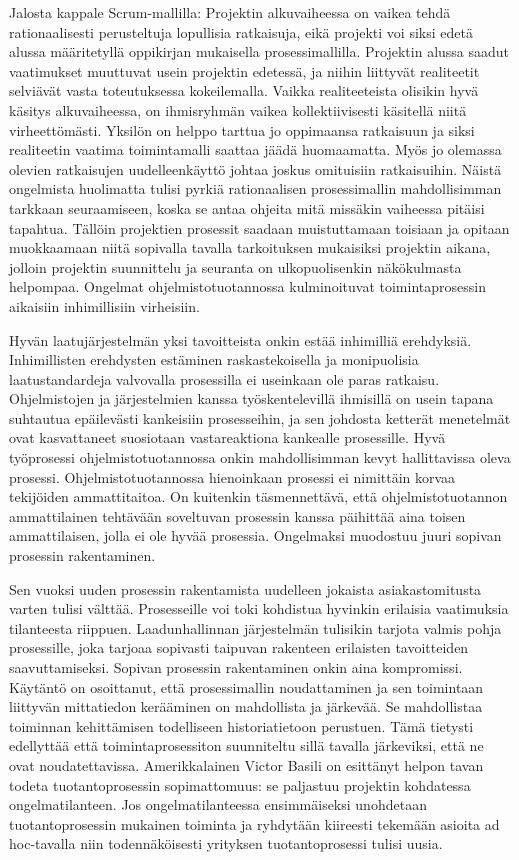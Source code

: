 \documentclass[finnish,12pt,a4paper,pdftex]{article}
\begin{document}
Jalosta kappale Scrum-mallilla:
Projektin alkuvaiheessa on vaikea tehdä rationaalisesti perusteltuja lopullisia ratkaisuja, eikä projekti voi siksi edetä alussa määritetyllä oppikirjan mukaisella prosessimallilla. Projektin alussa saadut vaatimukset muuttuvat usein projektin edetessä, ja niihin liittyvät realiteetit selviävät vasta toteutuksessa kokeilemalla. Vaikka realiteeteista olisikin hyvä käsitys alkuvaiheessa, on ihmisryhmän vaikea kollektiivisesti käsitellä niitä virheettömästi. Yksilön on helppo tarttua jo oppimaansa ratkaisuun ja siksi realiteetin vaatima toimintamalli saattaa jäädä huomaamatta. Myös jo olemassa olevien ratkaisujen uudelleenkäyttö johtaa joskus omituisiin ratkaisuihin. Näistä ongelmista huolimatta tulisi pyrkiä rationaalisen prosessimallin mahdollisimman tarkkaan seuraamiseen, koska se antaa ohjeita mitä missäkin vaiheessa pitäisi tapahtua. Tällöin projektien prosessit saadaan muistuttamaan toisiaan ja opitaan muokkaamaan niitä sopivalla tavalla tarkoituksen mukaisiksi projektin aikana, jolloin projektin suunnittelu ja seuranta on ulkopuolisenkin näkökulmasta helpompaa. Ongelmat ohjelmistotuotannossa kulminoituvat toimintaprosessin aikaisiin inhimillisiin virheisiin.\citep{ohjelmistotuotanto}

Hyvän laatujärjestelmän yksi tavoitteista onkin estää inhimilliä erehdyksiä. Inhimillisten erehdysten estäminen raskastekoisella ja monipuolisia laatustandardeja valvovalla prosessilla ei useinkaan ole paras ratkaisu. Ohjelmistojen ja järjestelmien kanssa työskentelevillä ihmisillä on usein tapana suhtautua epäilevästi kankeisiin prosesseihin, ja sen johdosta ketterät menetelmät ovat kasvattaneet suosiotaan vastareaktiona kankealle prosessille. Hyvä työprosessi ohjelmistotuotannossa onkin mahdollisimman kevyt hallittavissa oleva prosessi. Ohjelmistotuotannossa hienoinkaan prosessi ei nimittäin korvaa tekijöiden ammattitaitoa. On kuitenkin täsmennettävä, että ohjelmistotuotannon ammattilainen tehtävään soveltuvan prosessin kanssa päihittää aina toisen ammattilaisen, jolla ei ole hyvää prosessia. Ongelmaksi muodostuu juuri sopivan prosessin rakentaminen. \citep{okaytannot}

Sen vuoksi uuden prosessin rakentamista uudelleen jokaista asiakastomitusta varten tulisi välttää. Prosesseille voi toki kohdistua hyvinkin erilaisia vaatimuksia tilanteesta riippuen. Laadunhallinnan järjestelmän tulisikin tarjota valmis pohja prosessille, joka tarjoaa sopivasti taipuvan rakenteen erilaisten tavoitteiden saavuttamiseksi. Sopivan prosessin rakentaminen onkin aina kompromissi. Käytäntö on osoittanut, että prosessimallin noudattaminen ja sen toimintaan liittyvän mittatiedon kerääminen on mahdollista ja järkevää. Se mahdollistaa toiminnan kehittämisen todelliseen historiatietoon perustuen. Tämä tietysti edellyttää että toimintaprosessiton suunniteltu sillä tavalla järkeviksi, että ne ovat noudatettavissa. Amerikkalainen Victor Basili on esittänyt helpon tavan todeta tuotantoprosessin sopimattomuus: se paljastuu projektin kohdatessa ongelmatilanteen. Jos ongelmatilanteessa ensimmäiseksi unohdetaan tuotantoprosessin mukainen toiminta ja ryhdytään kiireesti tekemään asioita ad hoc-tavalla niin todennäköisesti yrityksen tuotantoprosessi tulisi uusia. \citep{ohjelmistotuotanto}
\end{document}
